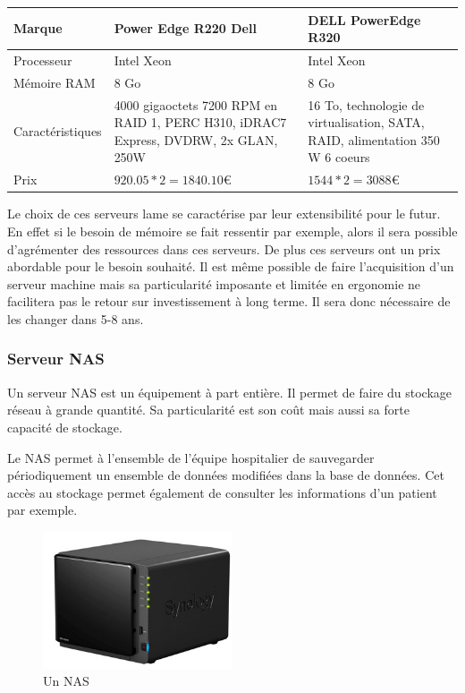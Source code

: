     \begin{center}
        \begin{tabular}{|l|p{5cm}|p{5cm}|}
          \hline
            Marque  &
Power Edge R220 Dell
    &   DELL PowerEdge R320
 \\
          \hline
Processeur
  &
Intel Xeon
    &
Intel Xeon
 \\
          \hline
Mémoire RAM
  &
8 Go
    &
8 Go
 \\
          \hline
            Caractéristiques  &
4000 gigaoctets 7200 RPM en RAID 1, PERC H310, iDRAC7 Express, DVDRW, 2x GLAN, 250W
                & 16 To, technologie de virtualisation, SATA, RAID, alimentation 350 W
6 coeurs
                  \\
        \hline
            Prix  &
$920.05 * 2 = 1840.10 \euro   $
    &
$1544 * 2 = 3088 \euro   $
 \\
          \hline
        \end{tabular}
    \end{center}

Le choix de ces serveurs lame se caractérise par leur extensibilité pour le futur. En effet si le besoin de mémoire se fait ressentir par exemple, alors il sera possible d'agrémenter des ressources dans ces serveurs. De plus ces serveurs ont un prix abordable pour le besoin souhaité. Il est même possible de faire l'acquisition d'un serveur machine mais sa particularité imposante et limitée en ergonomie ne facilitera pas le retour sur investissement à long terme. Il sera donc nécessaire de les changer dans 5-8 ans.


\subsubsection{Serveur NAS}

Un serveur NAS est un équipement à part entière. Il permet de faire du stockage réseau à grande quantité.
Sa particularité est son coût mais aussi sa forte capacité de stockage.

Le NAS permet à l'ensemble de l'équipe hospitalier de sauvegarder périodiquement un ensemble de données modifiées dans la base de données. Cet accès au stockage permet également de consulter les informations d'un patient par exemple.

\begin{figure}[!ht]
    \center
    \includegraphics[width=0.5\textwidth]{./images/15.png}
    \caption{Un NAS}
\end{figure}

